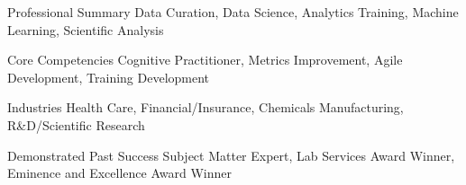 

\begin{cvskills}

  \cvskill
    {Professional Summary} %
    {Data Curation, Data Science, Analytics Training, Machine Learning, Scientific Analysis} %

  \cvskill
    {Core Competencies} %
    {Cognitive Practitioner, Metrics Improvement, Agile Development, Training Development} %

  \cvskill
    {Industries} %
    {Health Care, Financial/Insurance, Chemicals Manufacturing, R\&D/Scientific Research} %

  \cvskill
    {Demonstrated Past Success} %
    {Subject Matter Expert, Lab Services Award Winner, Eminence and Excellence Award Winner} %

\end{cvskills}
